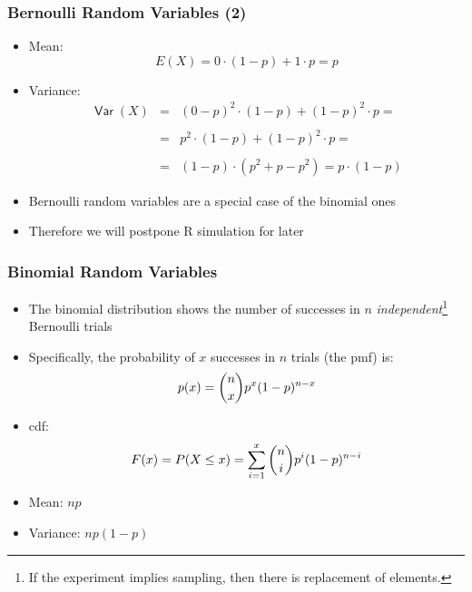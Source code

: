 \documentclass[10pt]{beamer}
\DeclareMathOperator{\var}{\mathsf{Var}}
\theoremstyle{definition}
\begin{document}
\begin{frame}[fragile]
\frametitle{Bernoulli Random Variables (2)}
\begin{itemize}
	\item Mean:
	\[
		E(X) = 0\cdot (1 - p) + 1\cdot p = p
	\]
	
	\item Variance:
	\[
		\begin{array}{lcl}
			\var(X) & = & (0 - p)^{2}\cdot (1 - p) + (1 - p) ^{2}\cdot p = \\
			\quad\\
			& = & p^{2}\cdot (1 - p) + (1 - p) ^{2}\cdot p = \\
			\quad\\
			& = & (1 - p)\cdot(p^{2} + p - p^{2}) = p\cdot (1 - p)
		\end{array}
	\]
	
	\item Bernoulli random variables are a special case of the binomial ones
	
	\item Therefore we will postpone R simulation for later	
\end{itemize}
\end{frame}

\begin{frame}[fragile]
\frametitle{Binomial Random Variables}
\begin{itemize}
	\item The binomial distribution shows the number of successes in $n$ \emph{independent}\footnote{If the experiment implies sampling, then there is replacement of elements.} Bernoulli trials
		
	\item Specifically, the probability of $x$ successes in $n$ trials (the pmf) is:
	\[
		p(x) = \dbinom{n}{x} p^{x}(1-p)^{n-x}
	\] 
	
	\item cdf:
	\[
		F(x) = P(X \leq x) = \sum_{i = 1}^{x}\dbinom{n}{i} p^{i}(1-p)^{n-i}
	\]
		
	\item Mean: $ np $
	
	\item Variance: $ np(1 - p) $
\end{itemize}
\end{frame}
\end{document}
